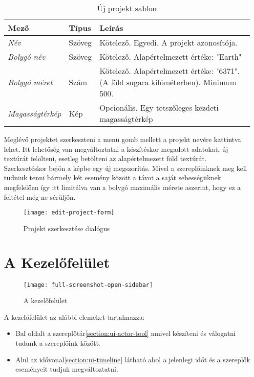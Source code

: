 \begin{table}[H]
	\centering
	\begin{tabular}{ | m{} | m{} | m{} | }
		\hline
		\textbf{Mező} & \textbf{Típus} & \textbf{Leírás} \\
		\hline \hline
		\emph{Név} & Szöveg & Kötelező. Egyedi. A projekt azonosítója. \\
		\hline
		\emph{Bolygó név} & Szöveg & Kötelező. Alapértelmezett értéke: "Earth" \\
		\hline
		\emph{Bolygó méret} & Szám & Kötelező. Alapértelmezett értéke: "6371". (A föld sugara kilóméterben). Minimum 500.  \\
		\hline
		\emph{Magasságtérkép} & Kép & Opcionális. Egy tetszőleges kezdeti magasságtérkép  \\
		\hline
	\end{tabular}
	\caption{Új projekt sablon}
	\label{tab:create-project-form}
\end{table}

Meglévő projektet szerkeszteni a menü gomb mellett a projekt nevére kattintva lehet. Itt lehetőség van megváltoztatni a készítéskor megadott adatokat, új textúrát felölteni, esetleg betölteni az alapértelmezett föld textúrát. Szerkesztéskor bejön a képbe egy új megszorítás. Mivel a szereplőinknek meg kell tudniuk tenni bármely két esemény között a távot a saját sebességüknek megfelelően így itt limitálva van a bolygó maximális mérete aszerint, hogy ez a feltétel még ne sérüljön.

\begin{figure}[h!]
	\centering
	\texttt{[image: edit-project-form]}
	\caption{
		Projekt szerkesztése dialógus}
	\label{fig:create-project-form}
\end{figure}

\pagebreak

\section{A Kezelőfelület} \label{section:ui}

\begin{figure}[h!]
	\centering
	\texttt{[image: full-screenshot-open-sidebar]}
	\caption{
		A kezelőfelület}
	\label{fig:full-screenshot-open-sidebar}
\end{figure}

A kezelőfelület az alábbi elemeket tartalmazza:

\begin{itemize}
	\item Bal oldalt a szereplőtár\cref{section:ui-actor-tool} amivel készíteni és válogatni tudunk a szereplőink között.
	\item Alul az idővonal\cref{section:ui-timeline} látható ahol a jelenlegi időt és a szereplők eseményeit tudjuk megváltoztatni.
\end{itemize}


